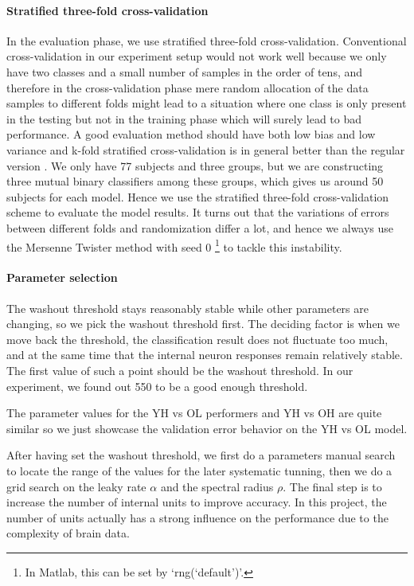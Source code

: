 \documentclass[a4paper,11pt,oneside]{article}
\begin{document}
\paragraph{Stratified three-fold cross-validation}
In the evaluation phase, we use stratified three-fold cross-validation. Conventional cross-validation in our experiment setup would not work well because we only have two classes and a small number of samples in the order of tens, and therefore in the cross-validation phase mere random allocation of the data samples to different folds might lead to a situation where one class is only present in the testing but not in the training phase which will surely lead to bad performance. A good evaluation method should have both low bias and low variance and k-fold stratified cross-validation is in general better than the regular version \cite{kohavi1995study}. We only have 77 subjects and three groups, but we are constructing three mutual binary classifiers among these groups, which gives us around 50 subjects for each model. Hence we use the stratified three-fold cross-validation scheme to evaluate the model results. It turns out that the variations of errors between different folds and randomization differ a lot, and hence we always use the Mersenne Twister method with seed 0 \footnote{In Matlab, this can be set by `rng(`default')'.} to tackle this instability. 

\paragraph{Parameter selection}
The washout threshold stays reasonably stable while other parameters are changing, so we pick the washout threshold first. The deciding factor is when we move back the threshold, the classification result does not fluctuate too much, and at the same time that the internal neuron responses remain relatively stable. The first value of such a point should be the washout threshold. In our experiment, we found out 550 to be a good enough threshold.

The parameter values for the YH vs OL performers and YH vs OH are quite similar so we just showcase the validation error behavior on the YH vs OL model. 

After having set the washout threshold, we first do a parameters manual search to locate the range of the values for the later systematic tunning, then we do a grid search on the leaky rate $\alpha$ and the spectral radius $\rho$. The final step is to increase the number of internal units to improve accuracy. In this project, the number of units actually has a strong influence on the performance due to the complexity of brain data.
\end{document}
